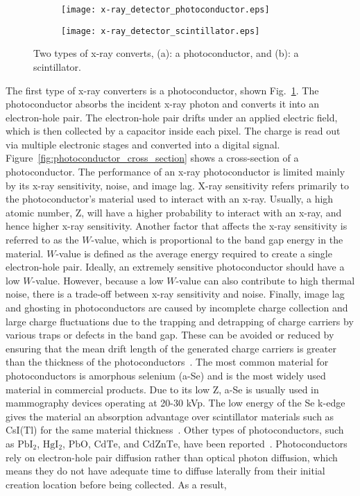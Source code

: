\begin{figure}[ht]
\centering
	\begin{subfigure}[h]{0.3\linewidth}
		\texttt{[image: x-ray\_detector\_photoconductor.eps]}
		\caption{}
		\label{fig:xray_photoconductor}
	\end{subfigure}
	\hspace{2 cm}
	\begin{subfigure}[h]{0.3\linewidth}
		\texttt{[image: x-ray\_detector\_scintillator.eps]}
		\caption{}
		\label{fig:xray_scintillator}
	\end{subfigure}
	\caption{Two types of x-ray converts, (a): a photoconductor, and (b): a scintillator.}
	\label{fig:x-ray_detector}
\end{figure}

The first type of x-ray converters is a photoconductor, shown Fig.~\ref{fig:xray_photoconductor}.  The photoconductor absorbs the incident x-ray photon and converts it into an electron-hole pair.  The electron-hole pair drifts under an applied electric field, which is then collected by a capacitor inside each pixel.  The charge is read out via multiple electronic stages and converted into a digital signal.  Figure~\ref{fig:photoconductor_cross_section} shows a cross-section of a photoconductor.  The performance of an x-ray photoconductor is limited mainly by its x-ray sensitivity, noise, and image lag.  X-ray sensitivity refers primarily to the photoconductor's material used to interact with an x-ray.  Usually, a high atomic number, Z, will have a higher probability to interact with an x-ray, and hence higher x-ray sensitivity.  Another factor that affects the x-ray sensitivity is referred to as the $W$-value, which is proportional to the band gap energy in the material.  $W$-value is defined as the average energy required to create a single electron-hole pair.  Ideally, an extremely sensitive photoconductor should have a low $W$-value.  However, because a low $W$-value can also contribute to high thermal noise, there is a trade-off between x-ray sensitivity and noise.  Finally, image lag and ghosting in photoconductors are caused by incomplete charge collection and large charge fluctuations due to the trapping and detrapping of charge carriers by various traps or defects in the band gap.  These can be avoided or reduced by ensuring that the mean drift length of the generated charge carriers is greater than the thickness of the photoconductors~\citep{Kim2008, kasap2006}.  The most common material for photoconductors is amorphous selenium (a-Se) and is the most widely used material in commercial products.  Due to its low Z, a-Se is usually used in mammography devices operating at 20-30 kVp.  The low energy of the Se k-edge gives the material an absorption advantage over scintillator materials such as CsI(Tl) for the same material thickness~\citep{Yorkston2007}.  Other types of photoconductors, such as $\mathrm{PbI_2}$, $\mathrm{HgI_2}$, $\mathrm{PbO}$, $\mathrm{CdTe}$, and $\mathrm{CdZnTe}$, have been reported~\citep{springer2007}.  Photoconductors rely on electron-hole pair diffusion rather than optical photon diffusion, which means they do not have adequate time to diffuse laterally from their initial creation location before being collected.  As a result, 